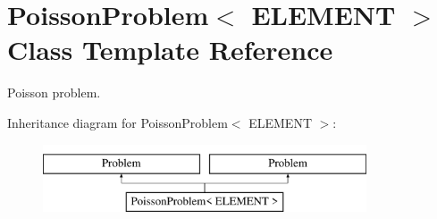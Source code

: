 \hypertarget{classPoissonProblem}{}\section{Poisson\+Problem$<$ E\+L\+E\+M\+E\+NT $>$ Class Template Reference}
\label{classPoissonProblem}


Poisson problem.  


Inheritance diagram for Poisson\+Problem$<$ E\+L\+E\+M\+E\+NT $>$\+:\begin{figure}[H]
\begin{center}
\leavevmode
\includegraphics[height=2.000000cm]{classPoissonProblem}
\end{center}
\end{figure}
